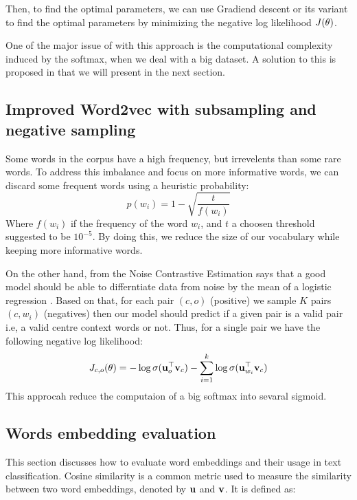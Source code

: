 Then, to find the optimal parameters, we can use Gradiend descent or its variant to find the optimal parameters by minimizing the negative log likelihood $J(\mathbf{\theta})$.

One of the major issue of with this approach is the computational complexity induced by the softmax, when we deal with a big dataset. A solution to this is proposed in \cite{sgns} that we will present in the next section.
\subsection{Improved Word2vec with subsampling and negative sampling}
Some words in the corpus have a high frequency, but irrevelents than some rare words. To address this imbalance and focus on more informative words,
we can discard some frequent words using a heuristic probability:
\begin{equation}
	p(w_i) = 1-\sqrt{\frac{t}{f(w_i)}}
\end{equation}
Where $f(w_i)$ if the frequency of the word $w_i$, and $t$ a choosen threshold suggested to be $10^{-5}$. By doing this, we reduce the size of our vocabulary while keeping more informative words.



On the other hand, from the Noise Contrastive Estimation says that a good model should be able to differntiate data from noise by the mean of a logistic regression \cite{sgns}. Based on that, for each pair $(c, o)$ (positive) we sample $K$  pairs $(c, w_i)$ (negatives) then our model should predict if a given pair is  a valid pair i.e, a valid centre context words or not. Thus, for a single pair we have the following negative log likelihood:
\begin{equation}
J_{c,o}(\mathbf{\theta}) = -\log\sigma(\mathbf{u}_o^\top\mathbf{v}_c) - \sum_{i=1}^{k}\log\sigma(\mathbf{u}_{w_i}^\top\mathbf{v}_c)
\end{equation}
This approcah reduce the computaion of a big softmax into sevaral sigmoid.

\subsection{Words embedding evaluation}
This section discusses how to evaluate word embeddings and their usage in text classification.
Cosine similarity is a common metric used to measure the similarity between two word embeddings, denoted by $\mathbf{u}$ and $\mathbf{v}$. It is defined as:

